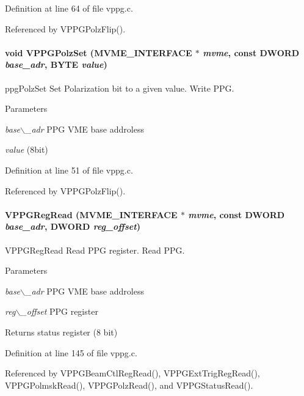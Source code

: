 Definition at line 64 of file vppg.c.

Referenced by VPPGPolzFlip().
\paragraph[{VPPGPolzSet}]{\setlength{\rightskip}{0pt plus 5cm}void VPPGPolzSet ({\bf MVME\_\-INTERFACE} $\ast$ {\em mvme}, \/  const {\bf DWORD} {\em base\_\-adr}, \/  {\bf BYTE} {\em value})}\hfill\label{vppg_8h_aba92a718f41a4d59f7ee3493fc703c42}
ppgPolzSet Set Polarization bit to a given value.  Write PPG. 
\begin{DoxyParams}{Parameters}
\item[{\em base$\backslash$\_\-adr}]PPG VME base addroless \item[{\em value}](8bit) \end{DoxyParams}


Definition at line 51 of file vppg.c.

Referenced by VPPGPolzFlip().
\paragraph[{VPPGRegRead}]{ VPPGRegRead ({\bf MVME\_\-INTERFACE} $\ast$ {\em mvme}, \/  const {\bf DWORD} {\em base\_\-adr}, \/  {\bf DWORD} {\em reg\_\-offset})}\hfill\label{vppg_8h_ab31234aa03b2821e9b5fc3be5a62d2fb}
VPPGRegRead Read PPG register.  Read PPG. 
\begin{DoxyParams}{Parameters}
\item[{\em base$\backslash$\_\-adr}]PPG VME base addroless \item[{\em reg$\backslash$\_\-offset}]PPG register \end{DoxyParams}
\begin{DoxyReturn}{Returns}
status register (8 bit) 
\end{DoxyReturn}


Definition at line 145 of file vppg.c.

Referenced by VPPGBeamCtlRegRead(), VPPGExtTrigRegRead(), VPPGPolmskRead(), VPPGPolzRead(), and VPPGStatusRead().
